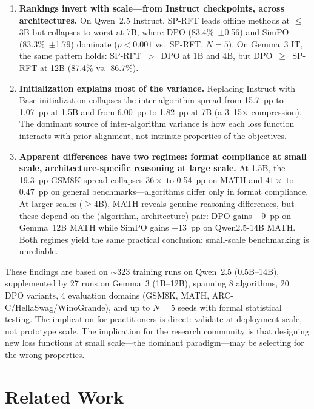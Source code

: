 \documentclass{article}
\newcommand{\sprft}{SP-RFT}
\begin{document}
\begin{enumerate}[leftmargin=*,itemsep=2pt]
    \item \textbf{Rankings invert with scale---from Instruct checkpoints, across architectures.}
    On Qwen~2.5 Instruct, \sprft{} leads offline methods at $\leq$3B but collapses to worst at 7B, where DPO (83.4\%~$\pm$0.56) and SimPO (83.3\%~$\pm$1.79) dominate ($p < 0.001$ vs.\ \sprft{}, $N{=}5$). On Gemma~3 IT, the same pattern holds: \sprft{}~$>$~DPO at 1B and 4B, but DPO~$\geq$~\sprft{} at 12B (87.4\% vs.\ 86.7\%).

    \item \textbf{Initialization explains most of the variance.}
    Replacing Instruct with Base initialization collapses the inter-algorithm spread from 15.7~pp to 1.07~pp at 1.5B and from 6.00~pp to 1.82~pp at 7B (a 3--15$\times$ compression). The dominant source of inter-algorithm variance is how each loss function interacts with prior alignment, not intrinsic properties of the objectives.

    \item \textbf{Apparent differences have two regimes: format compliance at small scale, architecture-specific reasoning at large scale.}
    At 1.5B, the 19.3~pp GSM8K spread collapses $36\times$ to 0.54~pp on MATH and $41\times$ to 0.47~pp on general benchmarks---algorithms differ only in format compliance. At larger scales ($\geq$4B), MATH reveals genuine reasoning differences, but these depend on the (algorithm, architecture) pair: DPO gains +9~pp on Gemma~12B MATH while SimPO gains +13~pp on Qwen2.5-14B MATH. Both regimes yield the same practical conclusion: small-scale benchmarking is unreliable.
\end{enumerate}

These findings are based on ${\sim}$323 training runs on Qwen~2.5 (0.5B--14B), supplemented by 27 runs on Gemma~3 (1B--12B), spanning 8 algorithms, 20 DPO variants, 4 evaluation domains (GSM8K, MATH, ARC-C/HellaSwag/WinoGrande), and up to $N{=}5$ seeds with formal statistical testing.
The implication for practitioners is direct: validate at deployment scale, not prototype scale. The implication for the research community is that designing new loss functions at small scale---the dominant paradigm---may be selecting for the wrong properties.

\section{Related Work}
\end{document}
